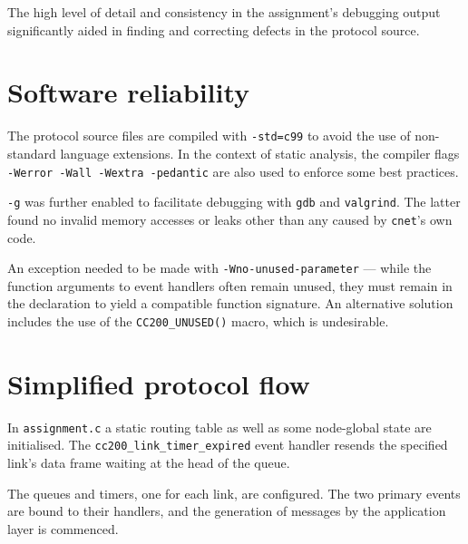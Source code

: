 \documentclass[a4paper,12pt,titlepage]{article}
\begin{document}
The high level of detail and consistency in the assignment's debugging output
significantly aided in finding and correcting defects in the protocol source.

\section{Software reliability}

The protocol source files are compiled with \texttt{-std=c99} to avoid the use
of non-standard language extensions. In the context of static analysis, the
compiler flags \texttt{-Werror -Wall -Wextra -pedantic} are also used to
enforce some best practices.

\texttt{-g} was further enabled to facilitate debugging with \texttt{gdb} and
\texttt{valgrind}. The latter found no invalid memory accesses or leaks other
than any caused by \texttt{cnet}'s own code.

An exception needed to be made with \texttt{-Wno-unused-parameter} --- while
the function arguments to event handlers often remain unused, they must remain
in the declaration to yield a compatible function signature. An alternative
solution includes the use of the \texttt{CC200\_UNUSED()} macro, which is
undesirable.

\section{Simplified protocol flow}

In \texttt{assignment.c} a static routing table as well as some node-global
state are initialised. The \texttt{cc200\_link\_timer\_expired} event handler
resends the specified link's data frame waiting at the head of the queue.

The queues and timers, one for each link, are configured. The two primary
events are bound to their handlers, and the generation of messages by the
application layer is commenced.
\end{document}
